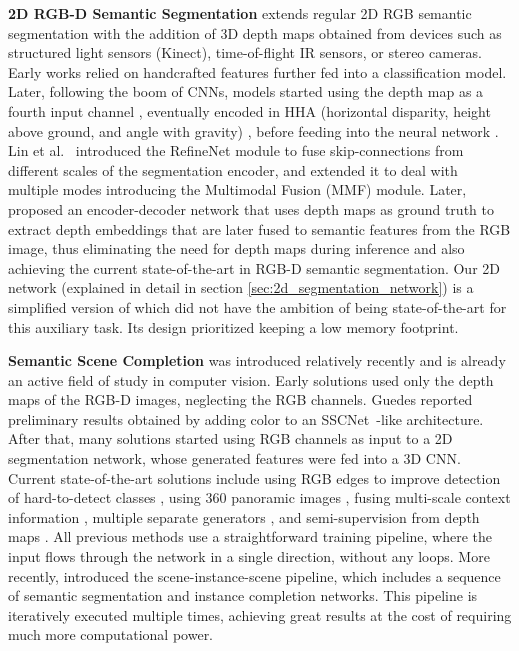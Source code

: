 \textbf{2D RGB-D Semantic Segmentation} extends regular 2D RGB semantic segmentation with the addition of 3D depth maps obtained from devices such as structured light sensors (\eg Kinect), time-of-flight IR sensors, or stereo cameras. Early works \cite{ren_2012,Gupta_2013,silberman_2012} relied on handcrafted features further fed into a classification model. Later, following the boom of CNNs, models started using the depth map as a fourth input channel \cite{Eigen_2015_ICCV}, eventually encoded in HHA (horizontal disparity, height above ground, and angle with gravity) \cite{Gupta_2014}, before feeding into the neural network \cite{FCNN, Qi_2017, Wang_2018_ECCV}. Lin et al.\ \cite{Lin_2017_CVPR} introduced the RefineNet module to fuse skip-connections from different scales of the segmentation encoder, and \cite{Park_2017_ICCV} extended it to deal with multiple modes introducing the Multimodal Fusion (MMF) module. Later, \cite{Jiao_2019_CVPR} proposed an encoder-decoder network that uses depth maps as ground truth to extract depth embeddings that are later fused to semantic features from the RGB image, thus eliminating the need for depth maps during inference and also achieving the current state-of-the-art in RGB-D semantic segmentation. Our 2D network (explained in detail in section \ref{sec:2d_segmentation_network}) is a simplified version of \cite{Park_2017_ICCV} which did not have the ambition of being state-of-the-art for this auxiliary task. Its design prioritized keeping a low memory footprint.

\textbf{Semantic Scene Completion} was introduced relatively recently \cite{song_semantic_2017} and is already an active field of study in computer vision. Early solutions  \cite{song_semantic_2017, zhang_semantic_2018,guo_view-volume_2018} used only the depth maps of the RGB-D images, neglecting the RGB channels. Guedes \etal\cite{guedes_semantic_2018} reported preliminary results obtained by adding color to an SSCNet~\cite{song_semantic_2017}-like architecture. After that, many solutions \cite{Garbade_2019_CVPR_Workshops,See_and_think_2018,Li_2020_CVPR,attention_2020} started using RGB channels as input to a 2D segmentation network, whose generated features were fed into a 3D CNN. Current state-of-the-art solutions include using RGB edges to improve detection of hard-to-detect classes \cite{edgnet}, using 360 panoramic images \cite{Dourado_etal_EdgeNet360_VISAPP2020}, fusing multi-scale context information \cite{CCPNet},  multiple separate generators \cite{ForkNet}, and semi-supervision from depth maps \cite{Sketch}. 
All previous methods use a straightforward training pipeline, where the input flows through the network in a single direction, without any loops. More recently, \cite{Cai_2021_CVPR} introduced the scene-instance-scene pipeline, which includes a sequence of semantic segmentation and instance completion networks. This pipeline is iteratively executed multiple times, achieving great results at the cost of requiring much more computational power.


